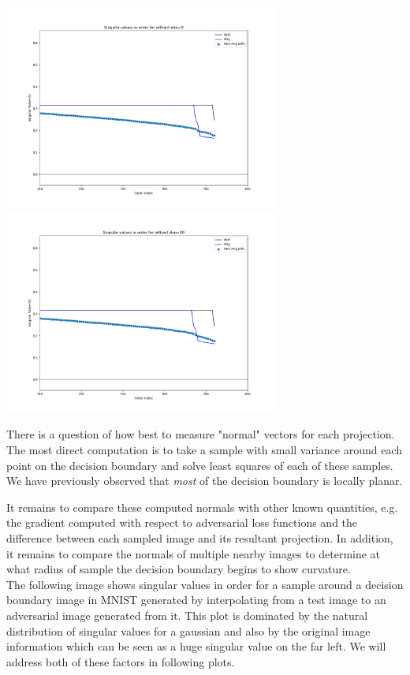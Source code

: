 \documentclass[10pt]{extarticle}
\begin{document}
\includegraphics[width=9cm]{img/e03-SVD-Orthant_origin-dim-cropped9.png}
\includegraphics[width=9cm]{img/e03-SVD-Orthant_origin-dim-cropped10.png}

There is a question of how best to measure "normal" vectors for each projection. The most direct computation is to take a sample with small variance around each point on the decision boundary and solve least squares of each of these samples. We have previously observed that \emph{most} of the decision boundary is locally planar. 

It remains to compare these computed normals with other known quantities, e.g. the gradient computed with respect to adversarial loss functions and the difference between each sampled image and its resultant projection. In addition, it remains to compare the normals of multiple nearby images to determine at what radius of sample the decision boundary begins to show curvature.\\

The following image shows singular values in order for a sample around a decision boundary image in MNIST generated by interpolating from a test image to an adversarial image generated from it. This plot is dominated by the natural distribution of singular values for a gaussian and also by the original image information which can be seen as a huge singular value on the far left. We will address both of these factors in following plots. \\
\end{document}
